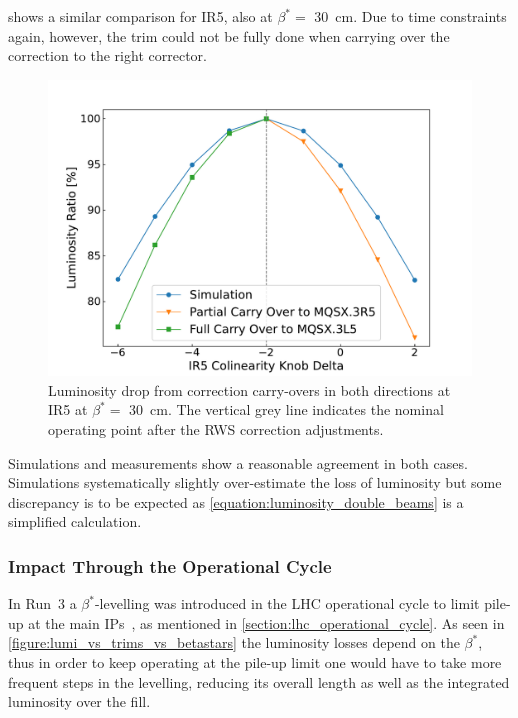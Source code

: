  shows a similar comparison for IR\num{5}, also at \(\beta^{\ast} =\) \qty{30}{\centi\meter}.
Due to time constraints again, however, the trim could not be fully done when carrying over the correction to the right corrector.

\begin{figure}[!htb]
    \centering
    \includegraphics*[width=\textwidth]{Figures/IR_Coupling_Correction/ir5_scans_vs_simu.pdf}
    \caption{Luminosity drop from correction carry-overs in both directions at IR\num{5} at \(\beta^{\ast} =\) \qty{30}{\centi\meter}. The vertical grey line indicates the nominal operating point after the RWS correction adjustments.}
    \label{figure:ir5_carry_over_vs_simulations}
\end{figure}

Simulations and measurements show a reasonable agreement in both cases.
Simulations systematically slightly over-estimate the loss of luminosity but some discrepancy is to be expected as \cref{equation:luminosity_double_beams} is a simplified calculation.

\subsubsection*{Impact Through the Operational Cycle}

In Run~\num{3} a \(\beta^{\ast}\)-levelling was introduced in the LHC operational cycle to limit pile-up at the main IPs~\cite{MEETING:Fartoukh:Run3_Configuration}, as mentioned in \cref{section:lhc_operational_cycle}.
As seen in \cref{figure:lumi_vs_trims_vs_betastars} the luminosity losses depend on the \(\beta^{\ast}\), thus in order to keep operating at the pile-up limit one would have to take more frequent steps in the levelling, reducing its overall length as well as the integrated luminosity over the fill.

